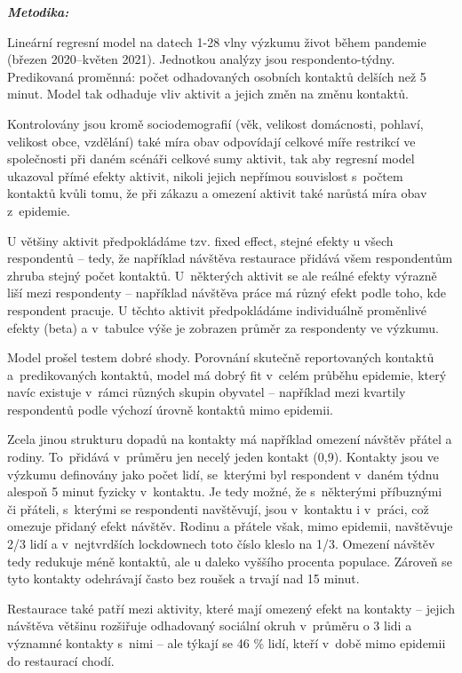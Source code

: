 {\it {\bf Metodika:}

Lineární regresní model na datech 1-28 vlny výzkumu život během pandemie (březen 2020–květen 2021). Jednotkou analýzy jsou respondento-týdny. Predikovaná proměnná: počet odhadovaných osobních kontaktů delších než 5 minut. Model tak odhaduje vliv aktivit a jejich změn na změnu kontaktů.

Kontrolovány jsou kromě sociodemografií (věk, velikost domácnosti, pohlaví, velikost obce, vzdělání) také míra obav odpovídají celkové míře restrikcí ve společnosti při daném scénáři celkové sumy aktivit, tak aby regresní model ukazoval přímé efekty aktivit, nikoli jejich nepřímou souvislost s počtem kontaktů kvůli tomu, že při zákazu a omezení aktivit také narůstá míra obav z epidemie.

U většiny aktivit předpokládáme tzv. fixed effect, stejné efekty u všech respondentů – tedy, že například návštěva restaurace přidává všem respondentům zhruba stejný počet kontaktů. U některých aktivit se ale reálné efekty výrazně liší mezi respondenty – například návštěva práce má různý efekt podle toho, kde respondent pracuje. U těchto aktivit předpokládáme individuálně proměnlivé efekty (beta) a v tabulce výše je zobrazen průměr za respondenty ve výzkumu.

Model prošel testem dobré shody. Porovnání skutečně reportovaných kontaktů a predikovaných kontaktů, model má dobrý fit v celém průběhu epidemie, který navíc existuje v rámci různých skupin obyvatel – například mezi kvartily respondentů podle výchozí úrovně kontaktů mimo epidemii.}

Zcela jinou strukturu dopadů na kontakty má například omezení návštěv přátel a rodiny. To přidává v průměru jen necelý jeden kontakt (0,9). Kontakty jsou ve výzkumu definovány jako počet lidí, se kterými byl respondent v daném týdnu alespoň 5 minut fyzicky v kontaktu. Je tedy možné, že s některými příbuznými či přáteli, s kterými se respondenti navštěvují, jsou v kontaktu i v práci, což omezuje přidaný efekt návštěv. Rodinu a přátele však, mimo epidemii, navštěvuje 2/3 lidí a v nejtvrdších lockdownech toto číslo kleslo na 1/3. Omezení návštěv tedy redukuje méně kontaktů, ale u daleko vyššího procenta populace. Zároveň se tyto kontakty odehrávají často bez roušek a trvají nad 15 minut. 

Restaurace také patří mezi aktivity, které mají omezený efekt na kontakty – jejich návštěva většinu rozšiřuje odhadovaný sociální okruh v průměru o 3 lidi a významné kontakty s nimi – ale týkají se 46 \% lidí, kteří v době mimo epidemii do restaurací chodí. 

